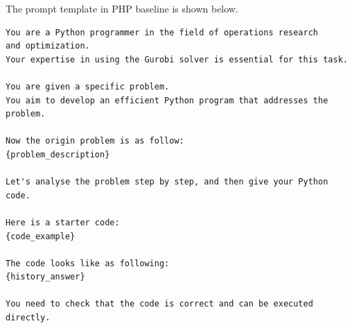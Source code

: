 \documentclass[letterpaper,onecolumn,12pt]{IEEEtran}
\begin{document}
The prompt template in PHP baseline is shown below.
\begin{lstlisting}[style=promptstyle]
You are a Python programmer in the field of operations research
and optimization.
Your expertise in using the Gurobi solver is essential for this task.

You are given a specific problem.
You aim to develop an efficient Python program that addresses the problem.

Now the origin problem is as follow:
{problem_description}

Let's analyse the problem step by step, and then give your Python code.

Here is a starter code:
{code_example}

The code looks like as following:
{history_answer}

You need to check that the code is correct and can be executed directly.
\end{lstlisting}
\end{document}
